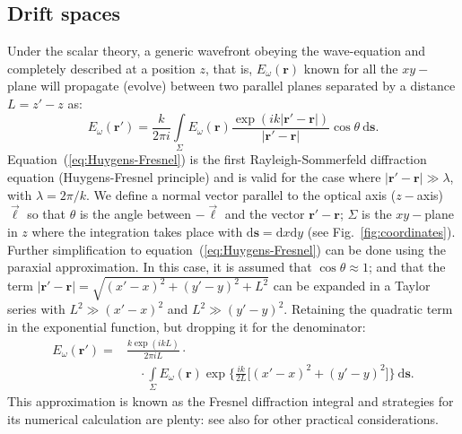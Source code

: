 \documentclass{iucr}
\newcommand{\inblue}[1]{{\color{blue}#1}}
\begin{document}
\subsection{Drift spaces}\label{sec:free_space}

Under the scalar theory, a generic wavefront obeying the wave-equation and completely described at a position $z$, that is, $E_\omega(\textbf{r})$ known for all the $xy-$plane will propagate (evolve) between two parallel planes separated by a distance $L=z'-z$ as: 
\begin{equation}\label{eq:Huygens-Fresnel}
    E_\omega(\textbf{r}') = \frac{k}{2\pi i}\int\limits_{\Sigma}{E_\omega(\textbf{r})\frac{\exp{(ik\vert\textbf{r}' - \textbf{r}\vert)}}{\vert\textbf{r}' - \textbf{r}\vert}\cos{\theta}~\mathrm{d}\textbf{s}}.
\end{equation}
Equation~(\ref{eq:Huygens-Fresnel}) is the first Rayleigh-Sommerfeld diffraction equation (Huygens-Fresnel principle) and is valid for the case where $\vert\textbf{r}' - \textbf{r}\vert\gg\lambda$, with $\lambda=2\pi \big/ k$. We define a normal vector parallel to the optical axis ($z-$axis) $\vec{\ell}$ so that $\theta$ is the angle between $-\vec{\ell}$ and the vector $\textbf{r}'-\textbf{r}$; $\Sigma$ is the $xy-$plane in $z$ where the integration takes place with $\mathrm{d}\textbf{s}=\mathrm{d}x\mathrm{d}y$ (see \inblue{Fig.~\ref{fig:coordinates}}). Further simplification to equation~(\ref{eq:Huygens-Fresnel}) can be done using the paraxial approximation. In this case, it is assumed that $\cos{\theta}\approx1$; and that the term $\vert\textbf{r}' - \textbf{r}\vert=\sqrt{(x'-x)^2 + (y'-y)^2 + L^2}$ can be expanded in a Taylor series with $L^2\gg(x'-x)^2$ and $L^2\gg(y'-y)^2$. Retaining the quadratic term in the exponential function, but dropping it for the denominator:
\begin{equation}\label{eq:Fresnel}
\begin{split}
    E_\omega(\textbf{r}') = &\frac{k\exp{(ikL)}}{2\pi i L}\cdot \\
    &\quad\cdot\int\limits_{\Sigma}{E_\omega(\textbf{r})\exp{\bigg\{ \frac{ik}{2L}\big[ (x'-x)^2 + (y'-y)^2 \big]\bigg\}}~\mathrm{d}\textbf{s}}.
\end{split}
\end{equation}
This approximation is known as the Fresnel diffraction integral and strategies for its numerical calculation are plenty: \cite{Kelly2014,Goodman2017} see also \cite{Rees87, Stern2004, Zhang2020} for other practical considerations.
\end{document}
